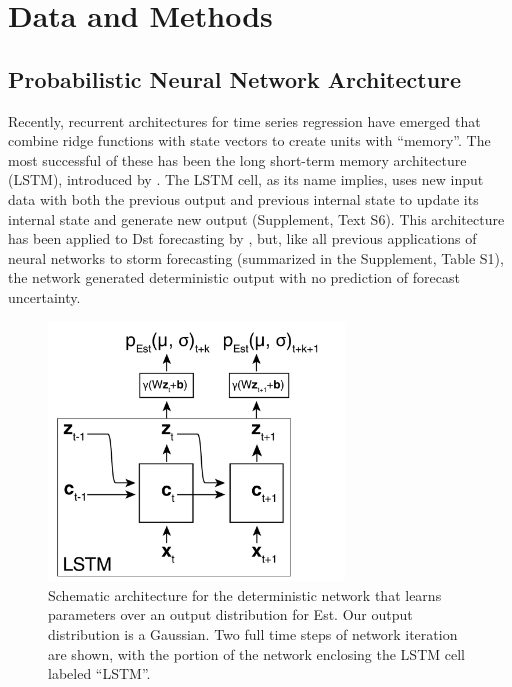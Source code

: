 \documentclass[draft,linenumbers]{agujournal2018}
\begin{document}
\section{Data and Methods}
% 
\subsection{Probabilistic Neural Network Architecture}
Recently, recurrent architectures for time series regression have emerged that combine ridge functions with state vectors to create units with ``memory''. The most successful of these has been the long short-term memory architecture (LSTM), introduced by \cite{Hochreiter1997}. The LSTM cell, as its name implies, uses new input data with both the previous output and previous internal state to update its internal state and generate new output (Supplement, Text S6). This architecture has been applied to Dst forecasting by \cite{Gruet2018}, but, like all previous applications of neural networks to storm forecasting (summarized in the Supplement, Table S1), the network generated deterministic output with no prediction of forecast uncertainty.

\begin{figure}[htbp]
   \centering
   \includegraphics[width=0.7\textwidth]{architecture_prob.pdf} %
   \caption{Schematic architecture for the deterministic network that learns parameters over an output distribution for Est. Our output distribution is a Gaussian. Two full time steps of network iteration are shown, with the portion of the network enclosing the LSTM cell labeled ``LSTM''.}
   \label{fig:architecture}
\end{figure}
\end{document}
